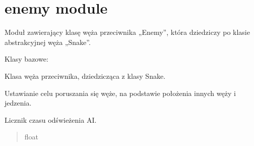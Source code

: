 \documentclass[letterpaper,10pt,polish]{sphinxmanual}
\begin{document}
\section{enemy module}
\label{\detokenize{enemy:module-enemy}}\label{\detokenize{enemy:enemy-module}}\label{\detokenize{enemy::doc}}
\sphinxAtStartPar
Moduł zawierający klasę węża przeciwnika „Enemy”, która dziedziczy po
klasie abstrakcyjnej węża „Snake”.

\begin{fulllineitems}
\label{\detokenize{enemy:enemy.Enemy}}
\pysigstartsignatures
{}
\pysigstopsignatures
\sphinxAtStartPar
Klasy bazowe: {\hyperref[\detokenize{snake:snake.Snake}]{}}

\sphinxAtStartPar
Klasa węża przeciwnika, dziedzicząca z klasy Snake.

\sphinxAtStartPar
Ustawianie celu poruszania się węże, na podstawie położenia innych węży
i jedzenia.

\begin{fulllineitems}
\label{\detokenize{enemy:enemy.Enemy.__ai_update_timer}}
\pysigstartsignatures
{}
\pysigstopsignatures
\sphinxAtStartPar
Licznik czasu odświeżenia AI.
\begin{quote}\begin{description}
\sphinxAtStartPar
float

\end{description}\end{quote}

\end{fulllineitems}



\end{fulllineitems}
\end{document}

